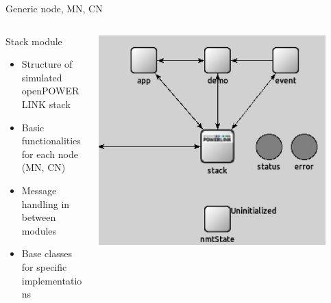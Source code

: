 \begin{frame}{Generic node, MN, CN}
    \begin{columns}
        \begin{column}{0.5\textwidth}
            \begin{block}{Stack module}
                \begin{itemize}
                    \item Structure of simulated openPOWERLINK stack
                    \item Basic functionalities for each node (MN, CN)
                    \item Message handling in between modules
                    \item Base classes for specific implementations
                \end{itemize}
            \end{block}
        \end{column}
        \begin{column}{0.5\textwidth}
                \includegraphics[width=0.9\textwidth]{../../thesis/images/simulation_genericnode.eps}
        \end{column}
    \end{columns}
\end{frame}

